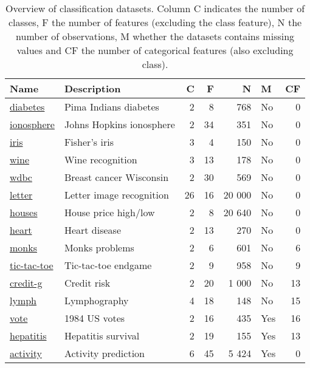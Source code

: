 \begin{table}
\centering
\begin{tabular}[htp]{ l l r r r l r }
    Name & Description & C & F & N & M & CF \\ \hline
    \href{https://www.openml.org/d/37}{diabetes} & Pima Indians diabetes & 2 & 8 & 768 & No & 0 \\
    \href{https://www.openml.org/d/59}{ionosphere} & Johns Hopkins ionosphere & 2 & 34 & 351 & No & 0 \\
    \href{https://www.openml.org/d/61}{iris} & Fisher's iris & 3 & 4 & 150 & No & 0 \\
    \href{https://www.openml.org/d/187}{wine} & Wine recognition & 3 & 13 & 178 & No & 0 \\
    \href{https://www.openml.org/d/1510}{wdbc} & Breast cancer Wisconsin & 2 & 30 & 569 & No & 0 \\
    \href{https://www.openml.org/d/6}{letter} & Letter image recognition & 26 & 16 & 20 000 & No & 0 \\
    \href{https://www.openml.org/d/823}{houses} & House price high/low & 2 & 8 & 20 640 & No & 0 \\
    \href{https://www.openml.org/d/53}{heart} & Heart disease & 2 & 13 & 270 & No & 0 \\
    \href{https://www.openml.org/d/334}{monks} & Monks problems & 2 & 6 & 601 & No & 6 \\
    \href{https://www.openml.org/d/50}{tic-tac-toe} & Tic-tac-toe endgame & 2 & 9 & 958 & No & 9 \\
    \href{https://www.openml.org/d/31}{credit-g} & Credit risk & 2 & 20 & 1 000 & No & 13 \\
    \href{https://www.openml.org/d/10}{lymph} & Lymphography & 4 & 18 & 148 & No & 15 \\
    \href{https://www.openml.org/d/56}{vote} & 1984 US votes & 2 & 16 & 435 & Yes & 16 \\
    \href{https://www.openml.org/d/55}{hepatitis} & Hepatitis survival & 2 & 19 & 155 & Yes & 13 \\
    \href{http://www.cis.fordham.edu/wisdm/dataset.php}{activity} & Activity prediction & 6 & 45 & 5 424 & Yes & 0 \\
\end{tabular}
\caption{Overview of classification datasets. Column C indicates the number of classes, F the number of features (excluding the class feature), N the number of observations, M whether the datasets contains missing values and CF the number of categorical features (also excluding class).}%
\label{tbl:datasets}
\end{table}

